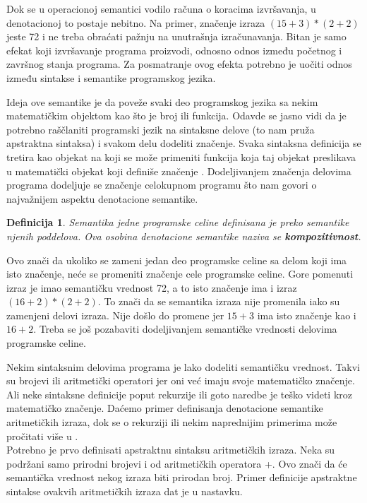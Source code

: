 \documentclass[a4paper]{article}
\newtheorem{definicija}{Definicija}[section]
\begin{document}
Dok se u operacionoj semantici vodilo računa o koracima izvršavanja, u denotacionoj to postaje nebitno. Na primer, značenje izraza $ (15+3)*(2+2) $ jeste 72 i ne treba obraćati pažnju na unutrašnja izračunavanja. Bitan je samo efekat koji izvršavanje programa proizvodi, odnosno odnos između početnog i završnog stanja programa. Za posmatranje ovog efekta potrebno je uočiti odnos između sintakse i semantike programskog jezika.

Ideja ove semantike je da poveže svaki deo programskog jezika sa nekim matematičkim objektom kao što je broj ili funkcija. Odavde se jasno vidi da je potrebno raščlaniti programski jezik na sintaksne delove (to nam pruža apstraktna sintaksa) i svakom delu dodeliti značenje. Svaka sintaksna definicija se tretira kao objekat na koji se može primeniti funkcija koja taj objekat preslikava u matematički objekat koji definiše značenje \cite{parezanovic}. Dodeljivanjem značenja delovima programa dodeljuje se značenje celokupnom programu što nam govori o najvažnijem aspektu denotacione semantike.
\begin{definicija}
Semantika jedne programske celine definisana je preko semantike njenih poddelova. Ova osobina denotacione semantike naziva se \textbf{kompozitivnost}.
\end{definicija}

Ovo znači da ukoliko se zameni jedan deo programske celine sa delom koji ima isto značenje, neće se promeniti značenje cele programske celine. Gore pomenuti izraz je imao semantičku vrednost 72, a to isto značenje ima i izraz $ (16+2)*(2+2) $. To znači da se semantika izraza nije promenila iako su zamenjeni delovi izraza. Nije došlo do promene jer $ 15+3 $ ima isto značenje kao i $ 16+2 $. Treba se još pozabaviti dodeljivanjem semantičke vrednosti delovima programske celine.

Nekim sintaksnim delovima programa je lako dodeliti semantičku vrednost. Takvi su brojevi ili aritmetički operatori jer oni već imaju svoje matematičko značenje. Ali neke sintaksne definicije poput rekurzije ili goto naredbe je teško videti kroz matematičko značenje. Daćemo primer definisanja denotacione semantike aritmetičkih izraza, dok se o rekurziji ili nekim naprednijim primerima može pročitati više u \cite{nielson}.\\


Potrebno je prvo definisati apstraktnu sintaksu aritmetičkih izraza. Neka su podržani samo prirodni brojevi i od aritmetičkih operatora +. Ovo znači da će semantička vrednost nekog izraza biti prirodan broj. Primer definicije apstraktne sintakse ovakvih aritmetičkih izraza dat je u nastavku.
\end{document}
